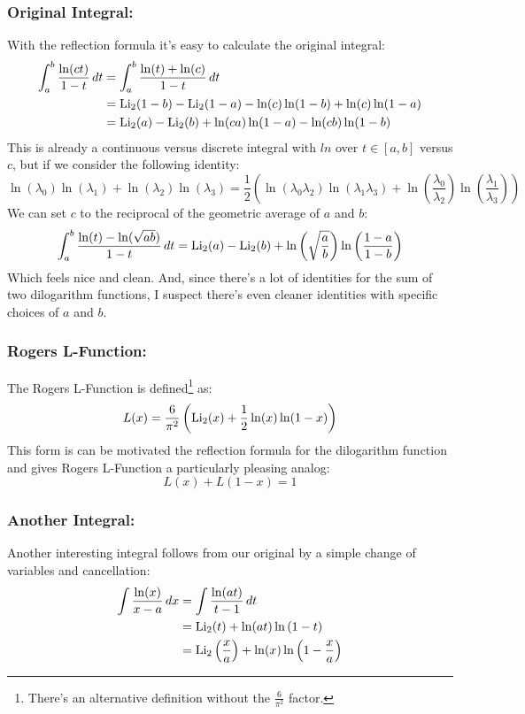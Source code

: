 \subsubsection{Original Integral:}
With the reflection formula it's easy to calculate the original integral:
\[\begin{aligned}
	\int_a^b\frac{\ln(ct)}{1-t}\,dt &=\int_a^b\frac{\ln(t)+\ln(c)}{1-t}\,dt \\
	&= \operatorname{Li}_2(1-b)-\operatorname{Li}_2(1-a)-\ln(c)\ln(1-b)+\ln(c)\ln(1-a)\\
	&= \operatorname{Li}_2(a)-\operatorname{Li}_2(b)+\ln(ca)\ln(1-a)- \ln(cb)\ln(1-b)\\
\end{aligned}\]
This is already a continuous versus discrete integral with $ln$ over $t\in[a,b]$ versus $c$,
but if we consider the following identity:
\[\ln(\lambda_0)\ln(\lambda_1)+\ln(\lambda_2)\ln(\lambda_3) = \frac{1}{2}\left(\ln(\lambda_0\lambda_2)\ln(\lambda_1\lambda_3)+\ln\left(\frac{\lambda_0}{\lambda_2}\right)\ln\left(\frac{\lambda_1}{\lambda_3}\right)\right)\]
We can set $c$ to the reciprocal of the geometric average of $a$ and $b$:
\[
\int_a^b\frac{\ln(t)-\ln(\sqrt{ab})}{1-t}\,dt =\operatorname{Li}_2(a)-\operatorname{Li}_2(b)+\ln\left(\sqrt{\frac{a}{b}}\right)\ln\left(\frac{1-a}{1-b}\right) \]
Which feels nice and clean.
And,
since there's a lot of identities for the sum of two dilogarithm functions,
I suspect there's even cleaner identities with specific choices of $a$ and $b$. 

\subsubsection{Rogers L-Function:}
The Rogers L-Function is defined\footnote{There's an alternative definition without the $\frac{6}{\pi^2}$ factor.} as:
\[L(x) = \frac{6}{\pi^2}\left(\operatorname{Li}_2(x)+\frac{1}{2}\ln(x)\ln(1-x)\right)\]
This form is can be motivated the reflection formula for the dilogarithm function and gives Rogers L-Function a particularly pleasing analog:
\[L(x)+L(1-x) = 1\]

\subsubsection{Another Integral:}
Another interesting integral follows from our original by a simple change of variables and cancellation:
\[\begin{aligned}
\int\frac{\ln(x)}{x-a}\,dx&=\int\frac{\ln(at)}{t-1}\,dt\\
&= \operatorname{Li}_2(t)+\ln(at)\ln\left(1-t\right)\\
&= \operatorname{Li}_2\left(\frac{x}{a}\right)+\ln(x)\ln\left(1-\frac{x}{a}\right)\\
\end{aligned}\]
